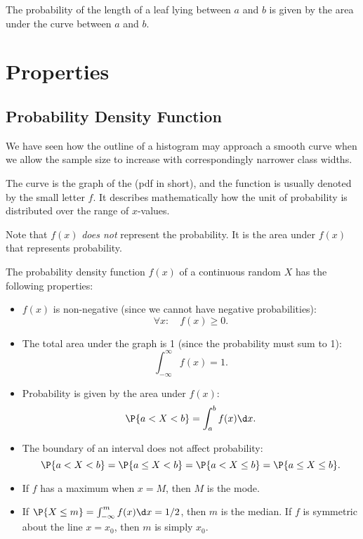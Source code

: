 The probability of the length of a leaf lying between $a$ and $b$ is given by the area under the curve between $a$ and $b$.

\section{Properties}

\subsection{Probability Density Function}

We have seen how the outline of a histogram may approach a smooth curve when we allow the sample size to increase with correspondingly narrower class widths.

\begin{definition}
    The curve is the graph of the  (pdf in short), and the function is usually denoted by the small letter $f$. It describes mathematically how the unit of probability is distributed over the range of $x$-values. 
\end{definition}

Note that $f(x)$ \emph{does not} represent the probability. It is the area under $f(x)$ that represents probability.

The probability density function $f(x)$ of a continuous random $X$ has the following properties:

\begin{fact}
    \phantom{.}
    \begin{itemize}
        \item $f(x)$ is non-negative (since we cannot have negative probabilities): \[\forall x: \quad f(x) \geq 0.\]
        \item The total area under the graph is 1 (since the probability must sum to 1): \[\int_{-\infty}^{\infty} f(x) = 1.\]
        \item Probability is given by the area under $f(x)$: \[\P{a < X < b} = \int_a^b f(x) \d x.\]
        \item The boundary of an interval does not affect probability: \[\P{a < X < b} = \P{a \leq X < b} = \P{a < X \leq b} = \P{a \leq X \leq b}.\]
        \item If $f$ has a maximum when $x = M$, then $M$ is the mode.
        \item If $\P{X \leq m} = \int_{-\infty}^m f(x) \d x = 1/2$, then $m$ is the median. If $f$ is symmetric about the line $x = x_0$, then $m$ is simply $x_0$.
    \end{itemize}
\end{fact}

